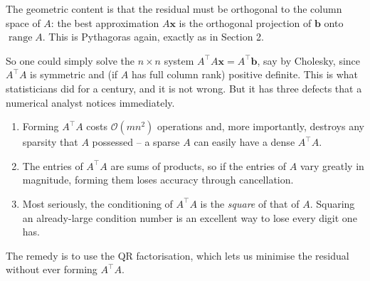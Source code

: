 \documentclass[a4paper]{scrartcl}
\begin{document}
The geometric content is that the residual must be orthogonal to the column space of $A$: the best approximation $A\mathbf x$ is the orthogonal projection of $\mathbf b$ onto $\operatorname{range}A$. This is Pythagoras again, exactly as in Section 2.

\begin{center}
\end{center}

So one could simply solve the $n\times n$ system $A^\top A\mathbf x = A^\top\mathbf b$, say by Cholesky, since $A^\top A$ is symmetric and (if $A$ has full column rank) positive definite. This is what statisticians did for a century, and it is not wrong. But it has three defects that a numerical analyst notices immediately.
\begin{enumerate}[label=(\roman*)]
  \item Forming $A^\top A$ costs $\mathcal{O}(mn^2)$ operations and, more importantly, destroys any sparsity that $A$ possessed -- a sparse $A$ can easily have a dense $A^\top A$.
  \item The entries of $A^\top A$ are sums of products, so if the entries of $A$ vary greatly in magnitude, forming them loses accuracy through cancellation.
  \item Most seriously, the conditioning of $A^\top A$ is the \emph{square} of that of $A$. Squaring an already-large condition number is an excellent way to lose every digit one has.
\end{enumerate}

The remedy is to use the QR factorisation, which lets us minimise the residual without ever forming $A^\top A$.
\end{document}
